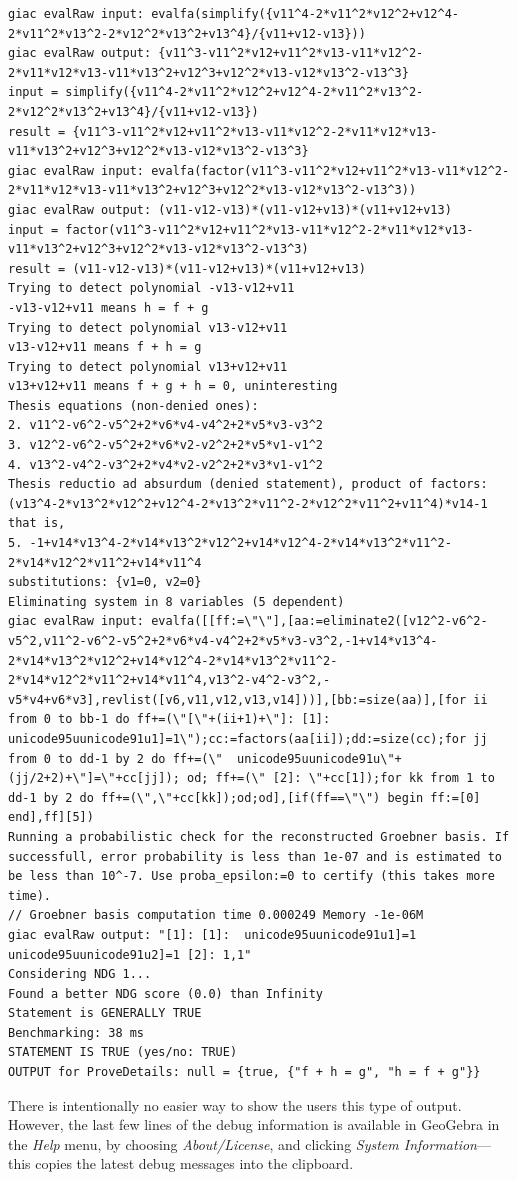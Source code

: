 \documentclass{article}
\begin{document}
{\begin{lstlisting}[language=mylog]
giac evalRaw input: evalfa(simplify({v11^4-2*v11^2*v12^2+v12^4-2*v11^2*v13^2-2*v12^2*v13^2+v13^4}/{v11+v12-v13}))
giac evalRaw output: {v11^3-v11^2*v12+v11^2*v13-v11*v12^2-2*v11*v12*v13-v11*v13^2+v12^3+v12^2*v13-v12*v13^2-v13^3}
input = simplify({v11^4-2*v11^2*v12^2+v12^4-2*v11^2*v13^2-2*v12^2*v13^2+v13^4}/{v11+v12-v13})
result = {v11^3-v11^2*v12+v11^2*v13-v11*v12^2-2*v11*v12*v13-v11*v13^2+v12^3+v12^2*v13-v12*v13^2-v13^3}
giac evalRaw input: evalfa(factor(v11^3-v11^2*v12+v11^2*v13-v11*v12^2-2*v11*v12*v13-v11*v13^2+v12^3+v12^2*v13-v12*v13^2-v13^3))
giac evalRaw output: (v11-v12-v13)*(v11-v12+v13)*(v11+v12+v13)
input = factor(v11^3-v11^2*v12+v11^2*v13-v11*v12^2-2*v11*v12*v13-v11*v13^2+v12^3+v12^2*v13-v12*v13^2-v13^3)
result = (v11-v12-v13)*(v11-v12+v13)*(v11+v12+v13)
Trying to detect polynomial -v13-v12+v11
-v13-v12+v11 means h = f + g
Trying to detect polynomial v13-v12+v11
v13-v12+v11 means f + h = g
Trying to detect polynomial v13+v12+v11
v13+v12+v11 means f + g + h = 0, uninteresting
Thesis equations (non-denied ones):
2. v11^2-v6^2-v5^2+2*v6*v4-v4^2+2*v5*v3-v3^2
3. v12^2-v6^2-v5^2+2*v6*v2-v2^2+2*v5*v1-v1^2
4. v13^2-v4^2-v3^2+2*v4*v2-v2^2+2*v3*v1-v1^2
Thesis reductio ad absurdum (denied statement), product of factors:
(v13^4-2*v13^2*v12^2+v12^4-2*v13^2*v11^2-2*v12^2*v11^2+v11^4)*v14-1
that is,
5. -1+v14*v13^4-2*v14*v13^2*v12^2+v14*v12^4-2*v14*v13^2*v11^2-2*v14*v12^2*v11^2+v14*v11^4
substitutions: {v1=0, v2=0}
Eliminating system in 8 variables (5 dependent)
giac evalRaw input: evalfa([[ff:=\"\"],[aa:=eliminate2([v12^2-v6^2-v5^2,v11^2-v6^2-v5^2+2*v6*v4-v4^2+2*v5*v3-v3^2,-1+v14*v13^4-2*v14*v13^2*v12^2+v14*v12^4-2*v14*v13^2*v11^2-2*v14*v12^2*v11^2+v14*v11^4,v13^2-v4^2-v3^2,-v5*v4+v6*v3],revlist([v6,v11,v12,v13,v14]))],[bb:=size(aa)],[for ii from 0 to bb-1 do ff+=(\"[\"+(ii+1)+\"]: [1]:  unicode95uunicode91u1]=1\");cc:=factors(aa[ii]);dd:=size(cc);for jj from 0 to dd-1 by 2 do ff+=(\"  unicode95uunicode91u\"+(jj/2+2)+\"]=\"+cc[jj]); od; ff+=(\" [2]: \"+cc[1]);for kk from 1 to dd-1 by 2 do ff+=(\",\"+cc[kk]);od;od],[if(ff==\"\") begin ff:=[0] end],ff][5])
Running a probabilistic check for the reconstructed Groebner basis. If successfull, error probability is less than 1e-07 and is estimated to be less than 10^-7. Use proba_epsilon:=0 to certify (this takes more time).
// Groebner basis computation time 0.000249 Memory -1e-06M
giac evalRaw output: "[1]: [1]:  unicode95uunicode91u1]=1  unicode95uunicode91u2]=1 [2]: 1,1"
Considering NDG 1...
Found a better NDG score (0.0) than Infinity
Statement is GENERALLY TRUE
Benchmarking: 38 ms
STATEMENT IS TRUE (yes/no: TRUE)
OUTPUT for ProveDetails: null = {true, {"f + h = g", "h = f + g"}}
\end{lstlisting}
} %
There is intentionally no easier way to show the users this type of output. However, the last few lines of the debug information is available in GeoGebra in the \textit{Help} menu, by choosing \textit{About/License}, and clicking \textit{System Information}---this copies the latest debug messages into the clipboard.
\end{document}
